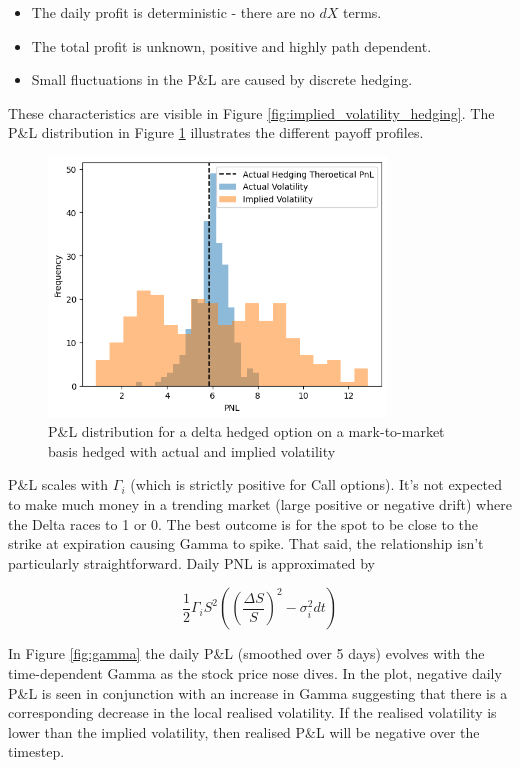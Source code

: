\documentclass{article}
\begin{document}
\begin{itemize}
    \item The daily profit is deterministic - there are no $dX$ terms.
    \item The total profit is unknown, positive and highly path dependent.
    \item Small fluctuations in the P\&L are caused by discrete hedging.
\end{itemize}

These characteristics are visible in Figure \ref{fig:implied_volatility_hedging}. The P\&L distribution in Figure \ref{fig:pnl_distribution} illustrates the 
different payoff profiles.

\begin{figure}[h]
    \centering
    \includegraphics[width=0.8\textwidth]{images/pnl_distribution.png}
    \caption{P\&L distribution for a delta hedged option on a mark-to-market basis hedged with actual and implied volatility}
    \label{fig:pnl_distribution}
\end{figure}

P\&L scales with $\Gamma_i$ (which is strictly positive for Call options). It's not expected to make much money in a trending market (large positive or negative drift)
where the Delta races to 1 or 0. The best outcome is for the spot to be close to the strike at expiration causing Gamma to spike. That said, the relationship isn't 
particularly straightforward. Daily PNL is approximated by 

\[
    \frac{1}{2}\Gamma_i S^2 ((\frac{\Delta S}{S})^2 - \sigma_i^2 dt)
\]

In Figure \ref{fig:gamma} the daily P\&L (smoothed over 5 days) evolves with the time-dependent Gamma as the stock price nose dives.
In the plot, negative daily P\&L is seen in conjunction with an increase in Gamma suggesting that there is a corresponding decrease in the local realised volatility. If 
the realised volatility is lower than the implied volatility, then realised P\&L will be negative over the timestep. 
\end{document}
